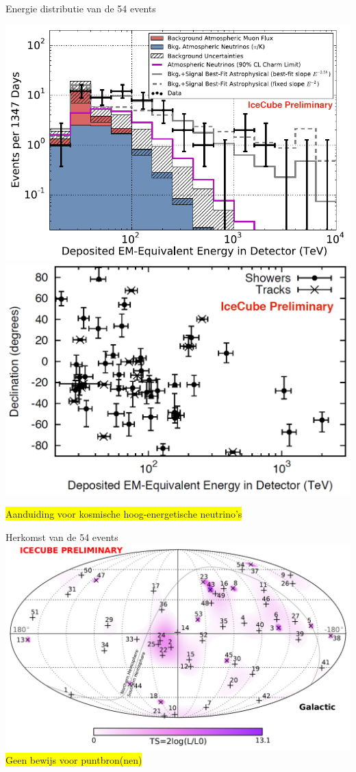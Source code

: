 \Tr
\onecolumn
\begin{center}
{\blue Energie distributie van de 54 events}
\end{center}
\includegraphics[keepaspectratio,width=13.5cm]{hese-e}
\includegraphics[keepaspectratio,width=13.5cm]{hese-decl-vs-e}
\begin{center}
\colorbox{yellow}{Aanduiding voor kosmische hoog-energetische neutrino's}
\end{center}

\Tr
\onecolumn
\begin{center}
{\blue Herkomst van de 54 events}\\[5mm]
\includegraphics[keepaspectratio,width=20cm]{hese-skymap-gal}\\
\colorbox{yellow}{Geen bewijs voor puntbron(nen)}
\end{center}
